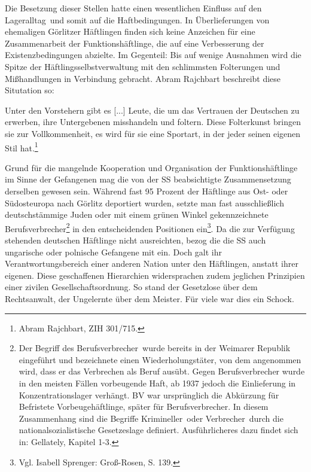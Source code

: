 \documentclass[a4paper,12pt,ngerman,
]{nisebook}
\begin{document}
Die Besetzung dieser Stellen hatte einen wesentlichen Einfluss auf den \glqq Lageralltag\grqq~und somit auf die Haftbedingungen. In Überlieferungen von ehemaligen Görlitzer Häftlingen finden sich keine Anzeichen für eine Zusammenarbeit der Funktionshäftlinge, die auf eine Verbesserung der Existenzbedingungen abzielte. Im Gegenteil: Bis auf wenige Ausnahmen wird die Spitze der Häftlingsselbstverwaltung mit den schlimmsten Folterungen und Mißhandlungen in Verbindung gebracht.
\newline Abram Rajchbart beschreibt diese Situtation so:
\begin{leftbar}
Unter den Vorstehern gibt es [...] Leute, die um das Vertrauen der Deutschen zu erwerben, ihre Untergebenen misshandeln und foltern.
Diese Folterkunst bringen sie zur Vollkommenheit, es wird für sie eine Sportart, in der jeder seinen eigenen Stil hat.\footnote{Abram Rajchbart, ZIH 301/715.}
\end{leftbar}
Grund für die mangelnde Kooperation und Organisation der Funktionshäftlinge im Sinne der Gefangenen mag die von der SS beabsichtigte Zusammensetzung derselben gewesen sein. Während fast 95 Prozent der Häftlinge aus Ost- oder Südosteuropa nach Görlitz deportiert wurden, setzte man fast ausschließlich deutschstämmige Juden oder mit einem grünen Winkel gekennzeichnete \glqq Berufsverbrecher\grqq\footnote{Der Begriff des \glqq Berufsverbrecher\grqq~wurde bereits in der Weimarer Republik eingeführt und bezeichnete einen Wiederholungstäter, von dem angenommen wird, dass er das Verbrechen als Beruf ausübt. Gegen Berufsverbrecher wurde in den meisten Fällen \glqq vorbeugende Haft\grqq, ab 1937 jedoch die Einlieferung in Konzentrationslager verhängt. BV war ursprünglich die Abkürzung für \glqq Befristete Vorbeugehäftlinge\grqq, später für Berufsverbrecher. In diesem Zusammenhang sind die Begriffe \glqq Krimineller\grqq~oder \glqq Verbrecher\grqq~durch die nationalsozialistische Gesetzeslage definiert. Ausführlicheres dazu findet sich in: Gellately, Kapitel 1-3.} in den entscheidenden Positionen ein\footnote{Vgl. Isabell Sprenger: Groß-Rosen, S. 139.}. Da die zur Verfügung stehenden deutschen Häftlinge nicht ausreichten, bezog die die SS auch ungarische oder polnische Gefangene mit ein. Doch galt ihr Verantwortungsbereich einer anderen Nation unter den Häftlingen, anstatt ihrer eigenen.
Diese geschaffenen Hierarchien widersprachen zudem jeglichen Prinzipien einer zivilen Gesellschaftsordnung. So stand der Gesetzlose über dem Rechtsanwalt, der Ungelernte über dem Meister. Für viele war dies ein Schock.
\end{document}
